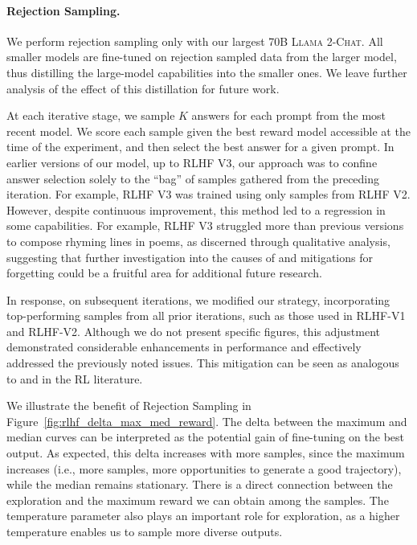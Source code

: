 \paragraph{Rejection Sampling.}

We perform rejection sampling only with our largest 70B \textsc{Llama 2-Chat}. All smaller models are fine-tuned on rejection sampled data from the larger model, thus distilling the large-model capabilities into the smaller ones. We leave further analysis of the effect of this distillation for future work.

At each iterative stage, we sample $K$ answers for each prompt from the most recent model. We score each sample given the best reward model accessible at the time of the experiment, and then select the best answer for a given prompt. In earlier versions of our model, up to RLHF V3, our approach was to confine answer selection solely to the ``bag'' of samples gathered from the preceding iteration. For example, RLHF V3 was trained using only samples from RLHF V2. However, despite continuous improvement, this method led to a regression in some capabilities. For example, RLHF V3 struggled more than previous versions to compose rhyming lines in poems, as discerned through qualitative analysis, suggesting that further investigation into the causes of and mitigations for forgetting \citep{kirkpatrick-etal-2017-overcoming, nguyen-etal-2019-toward,ramasesh-etal-2021-effect} could be a fruitful area for additional future research. 

In response, on subsequent iterations, we modified our strategy, incorporating top-performing samples from all prior iterations, such as those used in RLHF-V1 and RLHF-V2. Although we do not present specific figures, this adjustment demonstrated considerable enhancements in performance and effectively addressed the previously noted issues. This mitigation can be seen as analogous to \cite{synnaeve2019growing} and  \cite{vinyals2019grandmaster} in the RL literature.

We illustrate the benefit of Rejection Sampling in Figure~\ref{fig:rlhf_delta_max_med_reward}. The delta between the maximum and median curves can be interpreted as the potential gain of fine-tuning on the best output. As expected, this delta increases with more samples, since the maximum increases (i.e., more samples, more opportunities to generate a good trajectory), while the median remains stationary. There is a direct connection between the exploration and the maximum reward we can obtain among the samples. The temperature parameter also plays an important role for exploration, as a higher temperature enables us to sample more diverse outputs.

